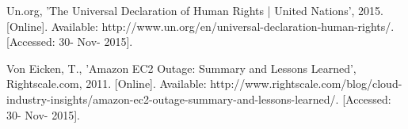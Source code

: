 \documentclass{scu-thesis}
\begin{document}
\begin{thebibliography}{9}
Un.org, 'The Universal Declaration of Human Rights | United Nations', 2015. [Online]. Available: http://www.un.org/en/universal-declaration-human-rights/. [Accessed: 30- Nov- 2015].

Von Eicken, T., 'Amazon EC2 Outage: Summary and Lessons Learned', Rightscale.com, 2011. [Online]. Available: http://www.rightscale.com/blog/cloud-industry-insights/amazon-ec2-outage-summary-and-lessons-learned/. [Accessed: 30- Nov- 2015].


\end{thebibliography}

\begin{appendices}



\end{appendices}

\backmatter
\end{document}
